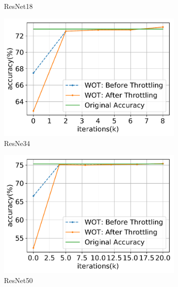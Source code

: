 \documentclass{article}
\begin{document}
\begin{figure}[t]
\begin{subfigure}{.32\textwidth}
    \caption{ResNet18}
    \end{subfigure}
    \begin{subfigure}{.32\textwidth}
    \includegraphics[width=\textwidth]{NeuRIPS2019/images/WOT_new/resnet34_accuracy.pdf}
    \caption{ResNe34}
    \end{subfigure}
\begin{subfigure}{.32\textwidth}
    \includegraphics[width=\textwidth]{NeuRIPS2019/images/WOT_new/resnet50_accuracy.pdf}
    \caption{ResNet50}
    \end{subfigure}
  \begin{subfigure}{.32\textwidth}

\end{subfigure}
\end{figure}
\end{document}
